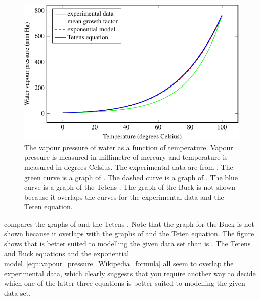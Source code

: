 \documentclass[a4paper,oneside,12pt]{article}
\begin{document}
\begin{problem}
{\begin{solution}
\begin{figure}[!htbp]
\centering
\includegraphics[scale=1.1]{image/11/vapour-pressure.pdf}
\caption{%
  The vapour pressure of water as a function of temperature.  Vapour
  pressure is measured in millimetre of mercury and temperature is
  measured in degrees Celsius.  The experimental data are from
  .  The green curve is a graph of
  .  The dashed curve is a
  graph of .  The blue
  curve is a graph of the Tetens
  .  The graph of the Buck
   is not shown because it overlaps
  the curves for the experimental data and the Teten equation.
}
\label{fig:water_vapour_pressure}
\end{figure}

 compares the graphs of
and the Tetens .  Note that the
graph for the Buck  is not shown
because it overlaps with the graphs of
 and the Teten
equation.  The figure shows that
 is better suited to
modelling the given data set than is
.  The Tetens and Buck
equations and the exponential
model~\eqref{eqn:vapour_pressure_Wikipedia_formula} all seem to
overlap the experimental data, which clearly suggests that you require
another way to decide which one of the latter three equations is
better suited to modelling the given data set.


\end{solution}}
\end{problem}
\end{document}
